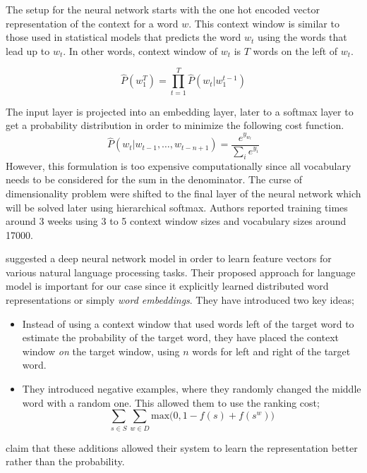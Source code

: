 The setup for the neural network starts with the one hot encoded vector representation of the context for a word $w$.
This context window is similar to those used in statistical models that predicts the word $w_t$ using the words that lead up to $w_t$.
In other words, context window of $w_t$ is $T$ words on the left of $w_t$.

\begin{displaymath}
    \hat{P}(w_1^T) = \prod_{t=1}^{T}\hat{P}(w_t | w_{1}^{t-1})
\end{displaymath}

The input layer is projected into an embedding layer, later to a softmax layer to get a probability distribution in order to minimize the following cost function.
\begin{equation}%
    \label{eqn:bengio_softmax}
    \hat{P}(w_t|w_{t-1}, \dots, w_{t-n+1}) = \frac{e^{y_{w_{t}}}}{\sum_{i}e^{y_{i}}}
\end{equation}
However, this formulation is too expensive computationally since all vocabulary needs to be considered for the sum in the denominator.
The curse of dimensionality problem were shifted to the final layer of the neural network which will be solved later using hierarchical softmax.
Authors reported training times around 3 weeks using 3 to 5 context window sizes and vocabulary sizes around 17000.

\textcite{collobert_unified_2008} suggested a deep neural network model in order to learn feature vectors for various natural language processing tasks.
Their proposed approach for language model is important for our case since it explicitly learned distributed word representations or simply \emph{word embeddings}.
They have introduced two key ideas;
\begin{itemize}
    \item Instead of using a context window that used words left of the target word to estimate the probability of the target word, they have placed the context window \emph{on} the target window, using $n$ words for left and right of the target word.
    \item They introduced negative examples, where they randomly changed the middle word with a random one. This allowed them to use the ranking cost;
        \begin{displaymath}
            \sum_{s \in S} \sum_{w \in D} \text{max}\big( 0, 1 - f(s) + f(s^w)\big)
        \end{displaymath}
\end{itemize}
\textcite{collobert_unified_2008} claim that these additions allowed their system to learn the representation better rather than the probability.

